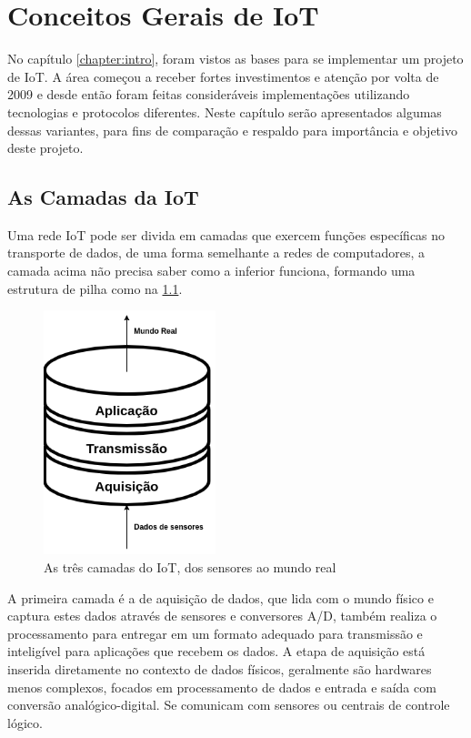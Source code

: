 \chapter{Conceitos Gerais de IoT}
\label{chapter:coneceitos}

No capítulo \ref{chapter:intro}, foram vistos as bases para se implementar um projeto de IoT. A área começou a receber fortes investimentos e atenção por volta de 2009 \cite{Rampim:iot} e desde então foram feitas consideráveis implementações utilizando tecnologias e protocolos diferentes. Neste capítulo serão apresentados algumas dessas variantes, para fins de comparação e respaldo para importância e objetivo deste projeto.

\section{As Camadas da IoT}
\label{section:camadas_iot}

Uma rede IoT pode ser divida em camadas que exercem funções específicas no transporte de dados, de uma forma semelhante a redes de computadores, a camada acima não precisa saber como a inferior funciona, formando uma estrutura de pilha como na \ref{fig:1.2.0/camadas_iot}.

\begin{figure}[h!]
\centering
\includegraphics[width=5cm]{./02_Capitulos/02_Cap1/figures/iot_stack}
\caption{As três camadas do IoT, dos sensores ao mundo real}
\label{fig:1.2.0/camadas_iot}
\end{figure}

A primeira camada é a de aquisição de dados, que lida com o mundo físico e captura estes dados através de sensores e conversores A/D, também realiza o processamento para entregar em um formato adequado para transmissão e inteligível para aplicações que recebem os dados. A etapa de aquisição está inserida diretamente no contexto de dados físicos, geralmente são hardwares menos complexos, focados em processamento de dados e entrada e saída com conversão analógico-digital. Se comunicam com sensores ou centrais de controle lógico.

